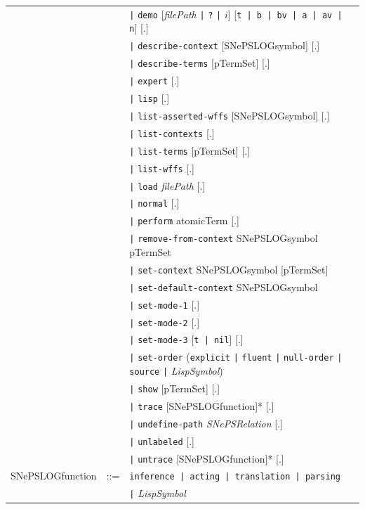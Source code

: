 \documentclass{book}
\begin{document}
\begin{table}[hbp]
\begin{tabular}{|lcl|}
                && \verb.|. \texttt{demo} [\textit{filePath}
                            \verb.|. \texttt{?} \verb.|. $i$]
                            [\verb.t | b | bv | a | av | n.] [.]\\
                && \verb.|. \texttt{describe-context} [SNePSLOGsymbol] [.]\\
                && \verb.|. \texttt{describe-terms} [pTermSet] [.]\\
                && \verb.|. \texttt{expert} [.]\\
                && \verb.|. \texttt{lisp} [.]\\
                && \verb.|. \texttt{list-asserted-wffs} [SNePSLOGsymbol] [.]\\
                && \verb.|. \texttt{list-contexts} [.]\\
                && \verb.|. \texttt{list-terms} [pTermSet] [.]\\
                && \verb.|. \texttt{list-wffs} [.]\\
                && \verb.|. \texttt{load} \textit{filePath} [.]\\
                && \verb.|. \texttt{normal} [.]\\
                && \verb.|. \texttt{perform} atomicTerm [.]\\
                && \verb.|. \texttt{remove-from-context} SNePSLOGsymbol pTermSet\\
                && \verb.|. \texttt{set-context} SNePSLOGsymbol [pTermSet]\\
                && \verb.|. \texttt{set-default-context} SNePSLOGsymbol \\
                && \verb.|. \texttt{set-mode-1}  [.]\\
                && \verb.|. \texttt{set-mode-2}  [.]\\
                && \verb.|. \texttt{set-mode-3} [\verb.t | nil.]  [.]\\
                && \verb.|. \texttt{set-order} (\texttt{explicit}
                \verb.|. \texttt{fluent} \verb.|. 
                \texttt{null-order} \verb.|. \texttt{source}
                \verb.|. \textit{LispSymbol})\\
                && \verb.|. \texttt{show} [pTermSet] [.]\\
                && \verb.|. \texttt{trace} [SNePSLOGfunction]* [.]\\
                && \verb.|. \texttt{undefine-path} \textit{SNePSRelation} [.]\\
                && \verb.|. \texttt{unlabeled} [.]\\
                && \verb.|. \texttt{untrace} [SNePSLOGfunction]* [.]\\
SNePSLOGfunction &::=& \verb.inference | acting | translation | parsing.\\
                && \verb.|. \textit{LispSymbol}\\\hline
\end{tabular}
\end{table}
\end{document}
